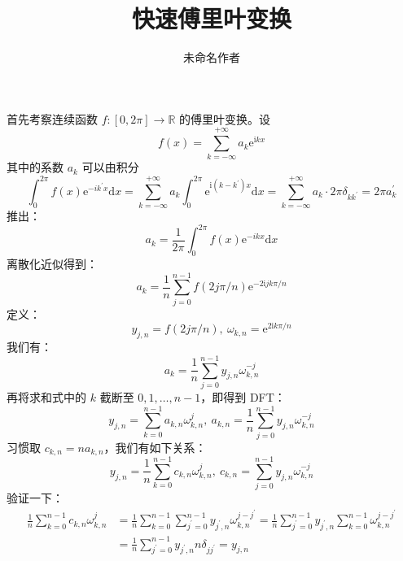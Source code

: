 \documentclass{ctexart}
\title{快速傅里叶变换}
\author{未命名作者}
\begin{document}
\maketitle

首先考察连续函数 $f: [0, 2\pi] \to \mathbb R$ 的傅里叶变换。设
\begin{equation}
  f(x) = \sum_{k = -\infty}^{+\infty} a_k\mathrm e^{\mathrm ikx}
\end{equation}
其中的系数 $a_k$ 可以由积分
\begin{equation}
  \int_0^{2\pi}f(x)\mathrm e^{\mathrm -ik^\prime x}\mathrm dx
  =
  \sum_{k = -\infty}^{+\infty} a_k\int_0^{2\pi}\mathrm e^{\mathrm i(k - k^\prime)x}\mathrm dx
  =
  \sum_{k = -\infty}^{+\infty} a_k \cdot 2\pi\delta_{kk^\prime}
  =
  2\pi a_k^{\prime}
\end{equation}
推出：
\begin{equation}
  a_k = \frac{1}{2\pi}\int_0^{2\pi}f(x)\mathrm e^{-ikx}\mathrm dx
\end{equation}
离散化近似得到：
\begin{equation}
  a_k = \frac{1}{n}\sum_{j = 0}^{n - 1}f(2j\pi / n)\mathrm e^{-2\mathrm ijk\pi/n}
\end{equation}
定义：
\begin{equation}
  y_{j,n} = f(2j\pi / n),\ \omega_{k,n} = \mathrm e^{2\mathrm ik\pi / n}
\end{equation}
我们有：
\begin{equation}
  a_k = \frac{1}{n}\sum_{j = 0}^{n - 1}y_{j,n}\omega_{k,n}^{-j}
\end{equation}
再将求和式中的 $k$ 截断至 $0, 1, \dots, n - 1$，即得到 DFT：
\begin{equation}
  y_{j,n} = \sum_{k = 0}^{n - 1}a_{k,n}\omega_{k,n}^j,\
  a_{k,n} = \frac{1}{n}\sum_{j = 0}^{n - 1}y_{j,n}\omega_{k,n}^{-j}
\end{equation}
习惯取 $c_{k,n} = na_{k,n}$，我们有如下关系：
\begin{equation}
  y_{j,n} = \frac{1}{n}\sum_{k = 0}^{n - 1}c_{k,n}\omega_{k,n}^j,\
  c_{k,n} = \sum_{j = 0}^{n - 1}y_{j,n}\omega_{k,n}^{-j}
\end{equation}
验证一下：
\begin{equation}
  \begin{split}
    \frac{1}{n}\sum_{k = 0}^{n - 1}c_{k,n}\omega_{k,n}^j
    &=
    \frac{1}{n}\sum_{k = 0}^{n - 1}\sum_{j^\prime = 0}^{n - 1}y_{j^\prime,n}\omega_{k,n}^{j - j^\prime}
    =
    \frac{1}{n}\sum_{j^\prime = 0}^{n - 1}y_{j^\prime,n}\sum_{k = 0}^{n - 1}\omega_{k,n}^{j - j^\prime}
    \\&=
    \frac{1}{n}\sum_{j^\prime = 0}^{n - 1}y_{j^\prime,n}n\delta_{jj^\prime}
    =
    y_{j,n}
  \end{split}
\end{equation}
\end{document}
